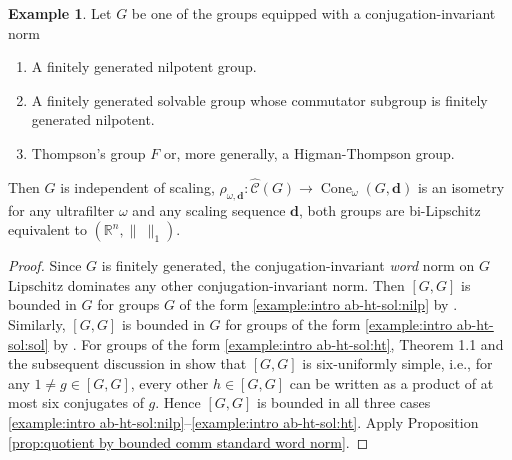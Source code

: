 \documentclass[12pt]{amsart}
\theoremstyle{definition}
\newtheorem{example}[prop]{Example}
\def\RR{\ensuremath{\mathbb{R}}}
\newcommand{\B}[1]{\mathbf{#1}}
\newcommand{\OP}[1]{\operatorname{#1}}
\def\Cone{\OP{Cone}}
\def\tC{\hat{\mathcal{C}}}
\begin{document}
\begin{example}\label{example:fg nilpotent groups}
Let $G$ be one of the groups equipped with a conjugation-invariant norm
\begin{enumerate}[leftmargin=* , label=(\roman*)]
\item \label{example:intro ab-ht-sol:nilp}
A finitely generated nilpotent group.

\item \label{example:intro ab-ht-sol:sol}
A finitely generated solvable group whose commutator subgroup is finitely generated nilpotent.

\item \label{example:intro ab-ht-sol:ht}
Thompson's group $F$ or, more generally, a Higman-Thompson group.
\end{enumerate}
Then $G$ is independent of scaling, $\rho_{\omega,\B d} \colon \tC(G) \to \Cone_\omega(G,\B d)$ is an isometry for any ultrafilter $\omega$ and any scaling sequence $\B d$, both groups are bi-Lipschitz equivalent to $(\RR^n,\| \ \|_1)$.
\begin{proof}
Since $G$ is finitely generated, the conjugation-invariant {\em word} norm on $G$ Lipschitz dominates any other conjugation-invariant norm.
Then $[G,G]$ is bounded in $G$ for groups $G$ of the form \ref{example:intro ab-ht-sol:nilp} by \cite[Theorem 5.H]{MR3426433}.
Similarly, $[G,G]$ is bounded in $G$ for  groups of the form \ref{example:intro ab-ht-sol:sol} by \cite[Theorem 5.K]{MR3426433}.
For groups of the form \ref{example:intro ab-ht-sol:ht}, Theorem 1.1 and the subsequent discussion in \cite[Theorem 1.1]{MR3693109} show that $[G,G]$ is six-uniformly simple, i.e., for any $1 \neq g \in [G,G]$, every other $h \in [G,G]$ can be written as a product of at most six conjugates of $g$. 
Hence $[G,G]$ is bounded in all three cases \ref{example:intro ab-ht-sol:nilp}--\ref{example:intro ab-ht-sol:ht}.
Apply Proposition \ref{prop:quotient by bounded comm standard word norm}.
\end{proof}
\end{example}
\end{document}
